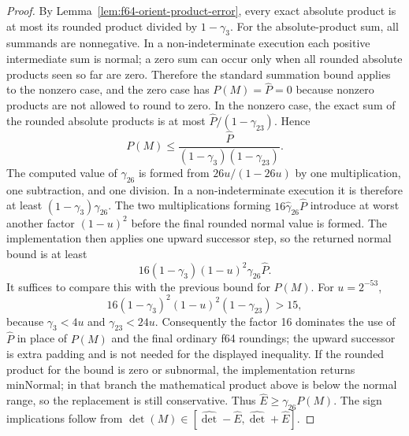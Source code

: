 \begin{proof}
By Lemma~\ref{lem:f64-orient-product-error}, every exact absolute product is at
most its rounded product divided by $1-\gamma_3$.  For the absolute-product
sum, all summands are nonnegative.  In a non-indeterminate execution each
positive intermediate sum is normal; a zero sum can occur only when all rounded
absolute products seen so far are zero.  Therefore the standard summation bound
applies to the nonzero case, and the zero case has $P(M)=\widehat P=0$ because
nonzero products are not allowed to round to zero.  In the nonzero case, the
exact sum of the rounded absolute products is at most
$\widehat P/(1-\gamma_{23})$.  Hence
\[
  P(M)\le \frac{\widehat P}{(1-\gamma_3)(1-\gamma_{23})}.
\]
The computed value of $\gamma_{26}$ is formed from $26u/(1-26u)$ by one
multiplication, one subtraction, and one division.  In a non-indeterminate
execution it is therefore at least $(1-\gamma_3)\gamma_{26}$.  The two
multiplications forming $16\widehat\gamma_{26}\widehat P$ introduce at worst
another factor $(1-u)^2$ before the final rounded normal value is formed.
The implementation then applies one upward successor step, so the returned
normal bound is at least
\[
  16(1-\gamma_3)(1-u)^2\gamma_{26}\widehat P .
\]
It suffices to compare this with the previous bound for $P(M)$.  For
$u=2^{-53}$,
\[
  16(1-\gamma_3)^2(1-u)^2(1-\gamma_{23}) > 15,
\]
because $\gamma_3<4u$ and $\gamma_{23}<24u$.  Consequently the factor 16
dominates the use of $\widehat P$ in place of $P(M)$ and the final ordinary f64
roundings; the upward successor is extra padding and is not needed for the
displayed inequality.  If the rounded product for the bound is zero or subnormal, the
implementation returns $\mathrm{minNormal}$; in that branch the mathematical
product above is below the normal range, so the replacement is still
conservative.  Thus $\widehat E\ge\gamma_{26}P(M)$.  The sign implications
follow from
$\det(M)\in[\widehat{\det}-\widehat E,\widehat{\det}+\widehat E]$.
\end{proof}

